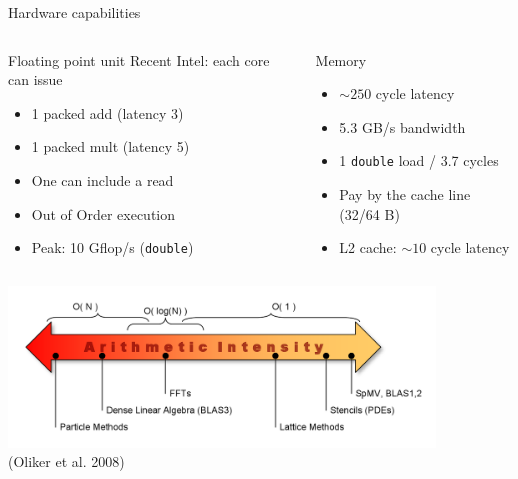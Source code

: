 \begin{frame}{Hardware capabilities}
  \begin{columns}
    \begin{column}{0.5\textwidth}
      \begin{block}{Floating point unit}
        Recent Intel: each core can issue
        \begin{itemize}
        \item 1 packed add (latency 3)
        \item 1 packed mult (latency 5)
        \item One can include a read
        \item Out of Order execution
        \item Peak: 10 Gflop/s (\texttt{double})
        \end{itemize}
      \end{block}
    \end{column}
    \begin{column}{0.5\textwidth}
      \begin{block}{Memory}
        \begin{itemize}
        \item $\sim 250$ cycle latency
        \item 5.3 GB/s bandwidth
        \item 1 \texttt{double} load / 3.7 cycles
        \item Pay by the cache line (32/64 B)
        \item L2 cache: $\sim 10$ cycle latency
        \end{itemize}
      \end{block}
    \end{column}
  \end{columns}
  \begin{block}{}%
    \centering
    \includegraphics[width=0.85\textwidth]{figures/OlikerArithmeticIntensity} \\
    \vspace{-1em}
    {\tiny (Oliker et al. 2008)}
  \end{block}
\end{frame}
